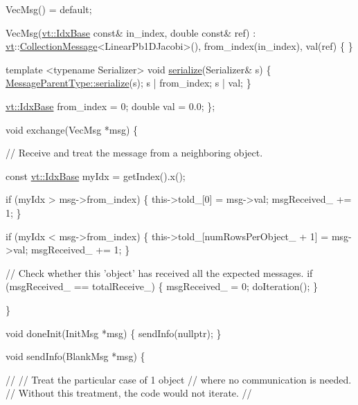 \begin{DoxyCodeInclude}
    VecMsg() = \textcolor{keywordflow}{default};

    VecMsg(\hyperlink{namespacevt_afb96657e28fa98eb685c5e0c6b1b122e}{vt::IdxBase} \textcolor{keyword}{const}& in\_index, \textcolor{keywordtype}{double} \textcolor{keyword}{const}& ref) :
      \hyperlink{namespacevt}{vt}::\hyperlink{namespacevt_ae7700e12f79c0fec16964aab84838428}{CollectionMessage}<LinearPb1DJacobi>(),
      from\_index(in\_index), val(ref)
    \{ \}

    \textcolor{keyword}{template} <\textcolor{keyword}{typename} Serializer>
    \textcolor{keywordtype}{void} \hyperlink{namespacecheckpoint_a075da4e7344cf037943362517e606c3a}{serialize}(Serializer& s) \{
      \hyperlink{namespacecheckpoint_a075da4e7344cf037943362517e606c3a}{MessageParentType::serialize}(s);
      s | from\_index;
      s | val;
    \}

    \hyperlink{namespacevt_afb96657e28fa98eb685c5e0c6b1b122e}{vt::IdxBase} from\_index = 0;
    \textcolor{keywordtype}{double} val = 0.0;
  \};

  \textcolor{keywordtype}{void} exchange(VecMsg *msg) \{

    \textcolor{comment}{// Receive and treat the message from a neighboring object.}

    \textcolor{keyword}{const} \hyperlink{namespacevt_afb96657e28fa98eb685c5e0c6b1b122e}{vt::IdxBase} myIdx = getIndex().x();

    \textcolor{keywordflow}{if} (myIdx > msg->from\_index) \{
      this->told\_[0] = msg->val;
      msgReceived\_ += 1;
    \}

    \textcolor{keywordflow}{if} (myIdx < msg->from\_index) \{
      this->told\_[numRowsPerObject\_ + 1] = msg->val;
      msgReceived\_ += 1;
    \}

    \textcolor{comment}{// Check whether this 'object' has received all the expected messages.}
    \textcolor{keywordflow}{if} (msgReceived\_ == totalReceive\_) \{
      msgReceived\_ = 0;
      doIteration();
    \}

  \}

  \textcolor{keywordtype}{void} doneInit(InitMsg *msg) \{
    sendInfo(\textcolor{keyword}{nullptr});
  \}

  \textcolor{keywordtype}{void} sendInfo(BlankMsg *msg) \{

    \textcolor{comment}{//}
    \textcolor{comment}{// Treat the particular case of 1 object}
    \textcolor{comment}{// where no communication is needed.}
    \textcolor{comment}{// Without this treatment, the code would not iterate.}
    \textcolor{comment}{//}


\end{DoxyCodeInclude}
